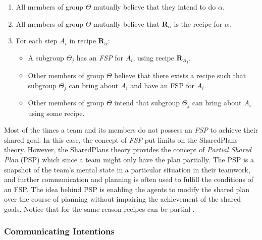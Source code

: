 \documentclass[11pt]{article}
\begin{document}
\begin{enumerate}
  \item All members of group $\Theta$ mutually believe that they intend to do
  $\alpha$.
  \item All members of group $\Theta$ mutually believe that
  \textit{$\textbf{R}_\alpha$} is the recipe for $\alpha$.
  \item For each step \textit{$A_i$} in recipe \textit{$\textbf{R}_\alpha$}:
  \begin{itemize}
    \item A subgroup $\Theta_j$ has an \textit{FSP} for \textit{$A_i$}, using
    recipe \textit{${\textbf{R}_A}_i$}.
    \item Other members of group $\Theta$ believe that there exists a recipe
    such that subgroup $\Theta_j$ can bring about \textit{$A_i$} and have an FSP
    for \textit{$A_i$}.
    \item Other members of group $\Theta$ intend that subgroup $\Theta_j$ can
    bring about \textit{$A_i$} using some recipe.
  \end{itemize}
\end{enumerate}

Most of the times a team and its members do not possess an \textit{FSP} to
achieve their shared goal. In this case, the concept of \textit{FSP} put limits
on the SharedPlans theory. However, the SharedPlans theory provides the concept
of \textit{Partial Shared Plan} (PSP) which since a team might only have the
plan partially. The PSP is a snapshot of the team's mental state in a particular
situation in their teamwork, and further communication and planning is often
used to fulfill the conditions of an FSP. The idea behind PSP is enabling the
agents to modify the shared plan over the course of planning without impairing
the achievement of the shared goals. Notice that for the same reason recipes
can be partial \cite{grosz:collaboration, grosz:plans-discourse}.

\subsubsection{Communicating Intentions}
\end{document}
